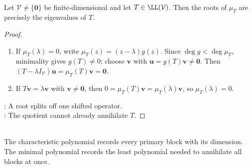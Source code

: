 \begin{theorem} \label{thm:operator-minimal-polynomial-roots-eigenvalues} \\
Let $\mathcal{V}\neq\{\mathbf{0}\}$ be finite-dimensional and let $T\in\LL(\mathcal{V})$. Then the roots of $\mu_T$ are precisely the eigenvalues of $T$.
\begin{proof}
\begin{enumerate}[label=\roman*.]
\setlength{\itemsep}{0pt}
\item[$(\Rightarrow)$] If $\mu_T(\lambda)=0$, write $\mu_T(z)=(z-\lambda)g(z)$. Since $\deg g<\deg\mu_T$, minimality gives $g(T)\neq0$; choose $\mathbf{v}$ with $\mathbf{u}=g(T)\mathbf{v}\neq\mathbf{0}$. Then $(T-\lambda I_{\mathcal{V}})\mathbf{u}=\mu_T(T)\mathbf{v}=\mathbf{0}$.
\item[$(\Leftarrow)$] If $T\mathbf{v}=\lambda\mathbf{v}$ with $\mathbf{v}\neq\mathbf{0}$, then $0=\mu_T(T)\mathbf{v}=\mu_T(\lambda)\mathbf{v}$, so $\mu_T(\lambda)=0$.
\end{enumerate}
: A root splits off one shifted operator.\\
: The quotient cannot already annihilate $T$.
\end{proof}
\end{theorem}

\begin{perspective} \label{per:characteristic-versus-minimal-polynomial} \\
The characteristic polynomial records every primary block with its dimension. The minimal polynomial records the least polynomial needed to annihilate all blocks at once.
\end{perspective}


